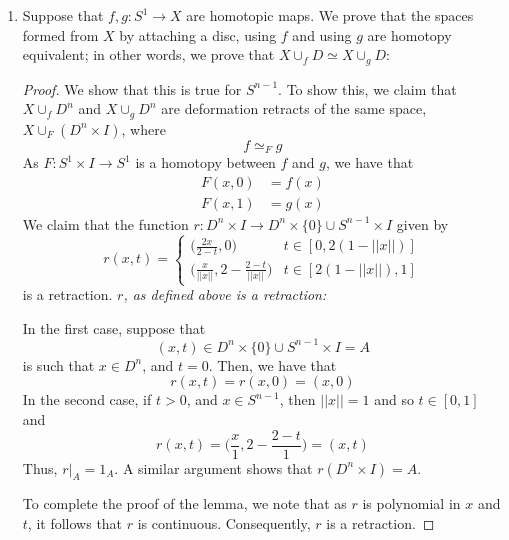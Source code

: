 \documentclass{book}
\newenvironment{Lemma}[1][Lemma]
{\proof[#1]\leftskip=1cm\rightskip=1cm}
{\endproof} %
\begin{document}
\begin{enumerate}[(1)]
    \item Suppose that $f,g: S^1 \rightarrow X$ are homotopic maps. We prove that the spaces formed from $X$ by attaching a disc, using $f$ and using $g$ are homotopy equivalent; in other words, we prove that $X \cup_f D \simeq X \cup_g D$: 
        \begin{proof} We show that this is true for $S^{n-1}$. To show this, we claim that $X \cup_f D^n$ and $X \cup_g D^n$ are deformation retracts of the same space, $X \cup_F (D^n \times I)$, where 
            \[f \simeq_F g\]
            As $F: S^1 \times I \rightarrow S^1$ is a homotopy between $f$ and $g$, we have that 
            \begin{align*}
                F(x,0) & = f(x) \\ 
                F(x, 1) & = g(x) 
            \end{align*}
            We claim that the function $r: D^n \times I \rightarrow D^n \times \{0\} \cup S^{n-1} \times I$ given by 
            \[ r(x,t) = 
            \begin{cases}
                \big( \frac{2x}{2-t} , 0 \big) & t \in [0, 2(1-||x||)] \\
                \big( \frac{x}{||x||}, 2 - \frac{2-t}{||x||} \big) & t \in [2(1-||x||), 1]
            \end{cases}
            \]
            is a retraction. 
            \begin{Lemma} \textit{$r$, as defined above is a retraction: }
                \par In the first case, suppose that 
                \[(x,t) \in D^n \times \{0\} \cup S^{n-1} \times I = A \]
                is such that $x \in D^n$, and $t = 0$. Then, we have that 
                \[r(x,t) = r(x,0) = (x,0)\]
                In the second case, if $t > 0$, and $x \in S^{n-1}$, then $||x||= 1$ and so $ t \in [0,1]$ and
                \[r(x,t) = \Big( \frac{x}{1} , 2 - \frac{2-t}{1}\Big) = (x,t) \]
                Thus, $r|_A = 1_A$. A similar argument shows that $r(D^n \times I) = A$.
                \par To complete the proof of the lemma, we note that as $r$ is polynomial in $x$ and $t$, it follows that $r$ is continuous. Consequently, $r$ is a retraction. 
            \end{Lemma}


\end{proof}
\end{enumerate}
\end{document}
